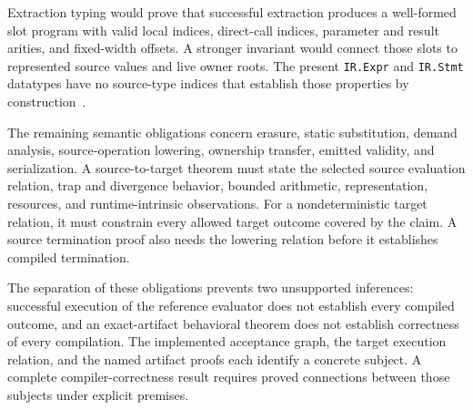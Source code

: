 \documentclass[11pt]{article}
\newcommand{\code}[1]{\texttt{#1}}
\begin{document}
Extraction typing would prove that successful extraction produces a well-formed slot program with valid local indices, direct-call indices, parameter and result arities, and fixed-width offsets.  A stronger invariant would connect those slots to represented source values and live owner roots.  The present \code{IR.Expr} and \code{IR.Stmt} datatypes have no source-type indices that establish those properties by construction~\cite{ir}.

The remaining semantic obligations concern erasure, static substitution, demand analysis, source-operation lowering, ownership transfer, emitted validity, and serialization.  A source-to-target theorem must state the selected source evaluation relation, trap and divergence behavior, bounded arithmetic, representation, resources, and runtime-intrinsic observations.  For a nondeterministic target relation, it must constrain every allowed target outcome covered by the claim.  A source termination proof also needs the lowering relation before it establishes compiled termination.

The separation of these obligations prevents two unsupported inferences: successful execution of the reference evaluator does not establish every compiled outcome, and an exact-artifact behavioral theorem does not establish correctness of every compilation.  The implemented acceptance graph, the target execution relation, and the named artifact proofs each identify a concrete subject.  A complete compiler-correctness result requires proved connections between those subjects under explicit premises.
\end{document}
